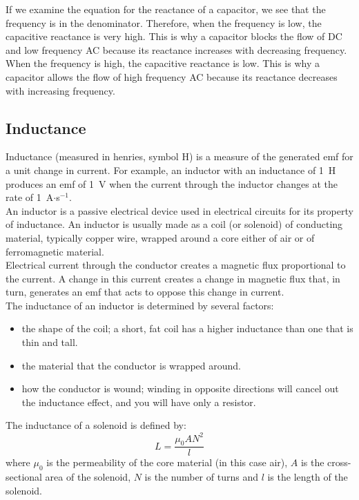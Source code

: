 If we examine the equation for the reactance of a capacitor, we see that the frequency is in the denominator. Therefore, when the frequency is low, the capacitive reactance is very high. This is why a capacitor blocks the flow of DC and low frequency AC because its reactance increases with decreasing frequency.\\ 
 
When the frequency is high, the capacitive reactance is low. This is why a capacitor allows the flow of high frequency AC because its reactance decreases with increasing frequency.


\subsection{Inductance}

Inductance (measured in henries, symbol H) is a measure of the generated emf for a unit change in current. For example, an inductor with an inductance of 1~H produces an emf of 1~V when the current through the inductor changes at the rate of 1~A$\cdot$s$^{-1}$.\\ 

An inductor is a passive electrical device used in electrical circuits for its property of inductance. An inductor is usually made as a coil (or solenoid) of conducting material, typically copper wire, wrapped around a core either of air or of ferromagnetic material.\\ 
 
Electrical current through the conductor creates a magnetic flux proportional to the current. A change in this current creates a change in magnetic flux that, in turn, generates an emf that acts to oppose this change in current.\\ 

 
The inductance of an inductor is determined by several factors:
\begin{itemize}
\item the shape of the coil; a short, fat coil has a higher inductance than one that is thin and tall.
\item the material that the conductor is wrapped around. 
\item how the conductor is wound; winding in opposite directions will cancel out the inductance effect, and you will have only a resistor.
\end{itemize}

The inductance of a solenoid is defined by:\\
 \begin{equation*}
L=\frac{\mu_0 A N^2}{l}
 \end{equation*}
where $\mu_0$ is the permeability of the core material (in this case air), $A$ is the cross-sectional area of the solenoid, $N$ is the number of turns and $l$ is the length of the solenoid. 

